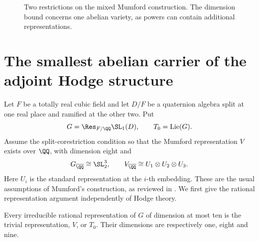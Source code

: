 \begin{figure}[tb]
\centering
{}
\caption{Two restrictions on the mixed Mumford construction. The dimension bound concerns one abelian variety, as powers can contain additional representations.}
\label{round26:fig:hodge-carriers}
\end{figure}

\section{The smallest abelian carrier of the adjoint Hodge structure}

Let $F$ be a totally real cubic field and let $D/F$ be a quaternion
algebra split at one real place and ramified at the other two. Put
\[
 G=\Res_{F/\QQ}\SL_1(D),\qquad T_0=\Lie(G).
\]
Assume the split-corestriction condition so that the Mumford
representation $V$ exists over $\QQ$, with dimension eight and
\[
 G_{\overline\QQ}\cong\SL_2^3,\qquad
 V_{\overline\QQ}\cong U_1\otimes U_2\otimes U_3.
\]
Here $U_i$ is the standard representation at the $i$-th embedding.
These are the usual assumptions of Mumford's construction, as
reviewed in \cite{Round26vGeemen01}. We first give the rational
representation argument independently of Hodge theory.

\begin{lemma}\label{round26:carrier:small-representations}
Every irreducible rational representation of $G$ of dimension at
most ten is the trivial representation, $V$, or $T_0$.
Their dimensions are respectively one, eight and nine.
\end{lemma}


